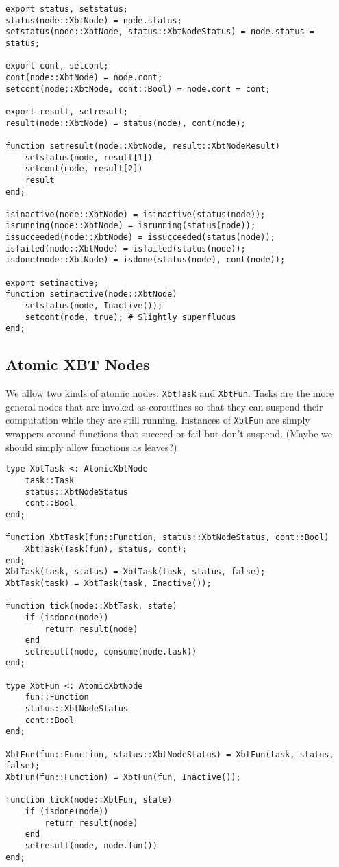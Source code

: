 \documentclass[a4wide]{article}
\begin{document}
\begin{verbatim}
export status, setstatus;
status(node::XbtNode) = node.status;
setstatus(node::XbtNode, status::XbtNodeStatus) = node.status = status;

export cont, setcont;
cont(node::XbtNode) = node.cont;
setcont(node::XbtNode, cont::Bool) = node.cont = cont;

export result, setresult;
result(node::XbtNode) = status(node), cont(node);

function setresult(node::XbtNode, result::XbtNodeResult)
    setstatus(node, result[1])
    setcont(node, result[2])
    result
end;

isinactive(node::XbtNode) = isinactive(status(node));
isrunning(node::XbtNode) = isrunning(status(node));
issucceeded(node::XbtNode) = issucceeded(status(node));
isfailed(node::XbtNode) = isfailed(status(node));
isdone(node::XbtNode) = isdone(status(node), cont(node));

export setinactive;
function setinactive(node::XbtNode)
    setstatus(node, Inactive());
    setcont(node, true); # Slightly superfluous
end;
\end{verbatim}

\subsection{Atomic XBT Nodes}
\label{sec-3-4}

We allow two kinds of atomic nodes: \verb~XbtTask~ and \verb~XbtFun~.  Tasks
are the more general nodes that are invoked as coroutines so that
they can suspend their computation while they are still running.
Instances of \verb~XbtFun~ are simply wrappers around functions that
succeed or fail but don't suspend.  (Maybe we should simply allow
functions as leaves?)

\begin{verbatim}
type XbtTask <: AtomicXbtNode
    task::Task
    status::XbtNodeStatus
    cont::Bool
end;

function XbtTask(fun::Function, status::XbtNodeStatus, cont::Bool)
    XbtTask(Task(fun), status, cont);
end;
XbtTask(task, status) = XbtTask(task, status, false);
XbtTask(task) = XbtTask(task, Inactive());

function tick(node::XbtTask, state)
    if (isdone(node))
        return result(node)
    end
    setresult(node, consume(node.task))
end;

type XbtFun <: AtomicXbtNode
    fun::Function
    status::XbtNodeStatus
    cont::Bool
end;

XbtFun(fun::Function, status::XbtNodeStatus) = XbtFun(task, status, false);
XbtFun(fun::Function) = XbtFun(fun, Inactive());

function tick(node::XbtFun, state)
    if (isdone(node))
        return result(node)
    end
    setresult(node, node.fun())
end;
\end{verbatim}
\end{document}
